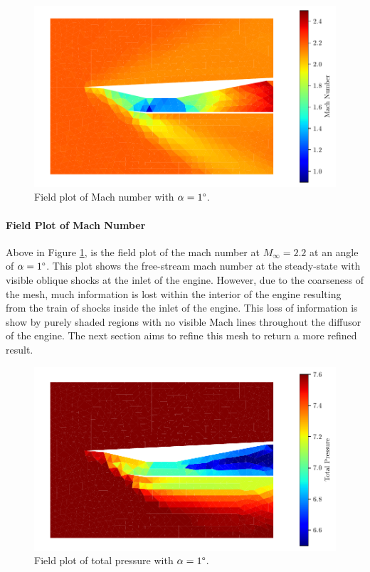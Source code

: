 \begin{figure}[h]
    \centering
    \includegraphics[width = 0.9\linewidth]{rep/q3/Machfield.pdf}
    \caption[Field Plot of Mach Number for Baseline Mesh]{Field plot of Mach number with $\alpha = 1\degree$.}
    \label{fig:mach_mesh0}
\end{figure}

\paragraph{Field Plot of Mach Number} Above in Figure \ref{fig:mach_mesh0}, is the field plot of the mach number at $M_\infty = 2.2$ at an angle of $\alpha=1\degree$. This plot shows the free-stream mach number at the steady-state with visible oblique shocks at the inlet of the engine. However, due to the coarseness of the mesh, much information is lost within the interior of the engine resulting from the train of shocks inside the inlet of the engine. This loss of information is show by purely shaded regions with no visible Mach lines throughout the diffusor of the engine. The next section aims to refine this mesh to return a more refined result.

\pagebreak
\begin{figure}[h]
    \centering
    \includegraphics[width = 0.9\linewidth]{rep/q3/Pfield.pdf}
    \caption[Field Plot of Total Pressure for Baseline Mesh]{Field plot of total pressure with $\alpha = 1\degree$.}
    \label{fig:pt_mesh0}
\end{figure}

